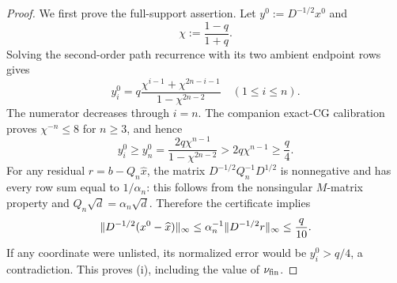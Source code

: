\begin{proof}
We first prove the full-support assertion.  Let
$y^0:=D^{-1/2}x^0$ and
\begin{equation*}
 \chi:=\frac{1-q}{1+q}.
\end{equation*}
Solving the second-order path recurrence with its two ambient endpoint rows
gives
\begin{equation}
 y_i^0
 =q\frac{\chi^{i-1}+\chi^{2n-i-1}}
          {1-\chi^{2n-2}}
 \quad(1\leq i\leq n).
 \label{eq:tight-path-exact-profile}
\end{equation}
The numerator decreases through $i=n$.  The companion exact-CG calibration
proves $\chi^{-n}\leq8$ for $n\geq3$, and hence
\begin{equation}
 y_i^0\geq y_n^0
 =\frac{2q\chi^{n-1}}{1-\chi^{2n-2}}
 >2q\chi^{n-1}\geq\frac q4.
 \label{eq:tight-path-minimum-solution}
\end{equation}
For any residual $r=b-Q_n\widehat x$, the matrix
$D^{-1/2}Q_n^{-1}D^{1/2}$ is nonnegative and has every row sum equal to
$1/\alpha_n$: this follows from the nonsingular $M$-matrix property and
$Q_n\sqrt d=\alpha_n\sqrt d$.  Therefore the certificate implies
\begin{equation*}
 \lVert D^{-1/2}(x^0-\widehat x)\rVert_\infty
 \leq\alpha_n^{-1}\lVert D^{-1/2}r\rVert_\infty
 \leq\frac q{10}.
\end{equation*}
If any coordinate were unlisted, its normalized error would be
$y_i^0>q/4$, a contradiction.  This proves (i), including the value of
$\nu_{\rm fin}$.


\end{proof}
